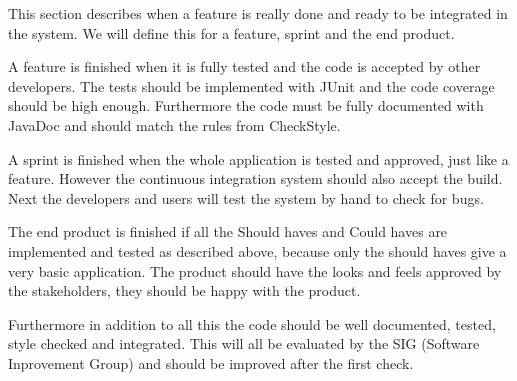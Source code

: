 This section describes when a feature is really done and ready to be integrated in the system. We will define this for a feature, sprint and the end product.

A feature is finished when it is fully tested and the code is accepted by other developers.
The tests should be implemented with JUnit and the code coverage should be high enough.
Furthermore the code must be fully documented with JavaDoc and should match the rules from CheckStyle.

A sprint is finished when the whole application is tested and approved, just like a feature. However the continuous integration system should also accept the build. Next the developers and users will test the system by hand to check for bugs.

The end product is finished if all the Should haves and Could haves are implemented and tested as described above, because only the should haves give a very basic application. The product should have the looks and feels approved by the stakeholders, they should be happy with the product.

Furthermore in addition to all this the code should be well documented, tested, style checked and integrated. This will all be evaluated by the SIG (Software Inprovement Group) and should be improved after the first check.